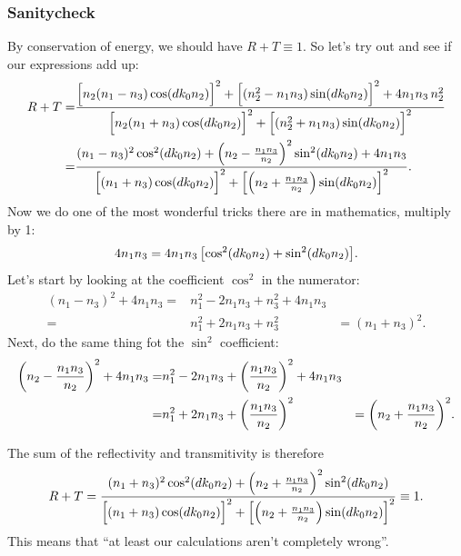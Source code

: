 \documentclass[11pt,letter, swedish, english
]{article}
\begin{document}
\subsubsection*{Sanitycheck}
By conservation of energy, we should have $R+T\equiv1$. So let's try
out and see if our expressions add up:
\begin{equation}
\begin{aligned}
R+T =& \frac{
\Big[n_2(n_1-n_3)\cos(dk_0n_2)\Big]^2 
+\Big[(n_2^2 -n_1n_3)\sin(dk_0n_2)\Big]^2
+4n_1n_3\,n_2^2
}{
\Big[n_2(n_1 +n_3)\cos(dk_0n_2)\Big]^2 
+\Big[(n_2^2 +n_1n_3)\sin(dk_0n_2)\Big]^2 
}\\
=& \frac{
(n_1-n_3)^2\cos^2(dk_0n_2)
+\qty(n_2 -\frac{n_1n_3}{n_2})^2\sin^2(dk_0n_2)
+4n_1n_3
}{
\Big[(n_1 +n_3)\cos(dk_0n_2)\Big]^2 
+\Big[\qty(n_2 +\frac{n_1n_3}{n_2})\sin(dk_0n_2)\Big]^2 
}.
\end{aligned}
\end{equation}
Now we do one of the most wonderful tricks there are in mathematics,
multiply by 1:
\begin{equation}
4n_1n_3 = 4n_1n_3\,\qty[\cos^2(dk_0n_2) + \sin^2(dk_0n_2)].
\end{equation}
Let's start by looking at the coefficient $\cos^2$ in the 
numerator:
\begin{equation}
\begin{aligned}
(n_1-n_3)^2 + 4n_1n_3
=& n_1^2 - 2n_1n_3 +n_3^2+ 4n_1n_3\\
=& n_1^2 + 2n_1n_3 +n_3^2
&= (n_1+n_3)^2.
\end{aligned}
\end{equation}
Next, do the same thing fot the $\sin^2$ coefficient:
\begin{equation}
\begin{aligned}
\qty(n_2-\frac{n_1n_3}{n_2})^2 + 4n_1n_3
=& n_1^2 - 2n_1n_3 +\qty(\frac{n_1n_3}{n_2})^2+ 4n_1n_3\\
=& n_1^2 + 2n_1n_3 +\qty(\frac{n_1n_3}{n_2})^2
&= \qty(n_2+\frac{n_1n_3}{n_2})^2.
\end{aligned}
\end{equation}

The sum of the reflectivity and transmitivity is therefore
\begin{equation}
\begin{aligned}
R+T = \frac{
(n_1+n_3)^2\cos^2(dk_0n_2)
+\qty(n_2 +\frac{n_1n_3}{n_2})^2\sin^2(dk_0n_2)
}{
\Big[(n_1 +n_3)\cos(dk_0n_2)\Big]^2 
+\Big[\qty(n_2 +\frac{n_1n_3}{n_2})\sin(dk_0n_2)\Big]^2 
}
\equiv 1.
\end{aligned}
\end{equation}
This means that ``at least our calculations aren't completely
wrong''. 
\end{document}

